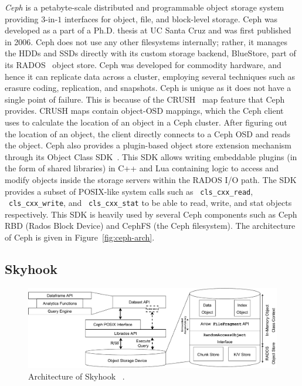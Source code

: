 \documentclass[11pt]{article}
\newcommand{\code}[1]{\colorbox{light-gray}{\texttt{#1}}}
\begin{document}
\textit{Ceph} is a petabyte-scale distributed and programmable object storage system providing $3$-in-$1$ interfaces for object, file, and block-level storage. Ceph was developed as a part of a Ph.D. thesis at UC Santa Cruz and was first published in 2006. Ceph does not use any other filesystems internally; rather, it manages the HDDs and SSDs directly with its custom storage backend, BlueStore, part of its RADOS~\cite{weil2007rados} object store. Ceph was developed for commodity hardware, and hence it can replicate data across a cluster, employing several techniques such as erasure coding, replication, and snapshots. Ceph is unique as it does not have a single point of failure. This is because of the CRUSH~\cite{weil2006crush} map feature that Ceph provides. CRUSH maps contain object-OSD mappings, which the Ceph client uses to calculate the location of an object in a Ceph cluster. After figuring out the location of an object, the client directly connects to a Ceph OSD and reads the object. Ceph also provides a plugin-based object store extension mechanism through its Object Class SDK~\cite{objectclasssdk}. This SDK allows writing embeddable plugins (in the form of shared libraries) in C++ and Lua containing logic to access and modify objects inside the storage servers within the RADOS I/O path. The SDK provides a subset of POSIX-like system calls such as ~\code{cls\_cxx\_read}, ~\code{cls\_cxx\_write}, and ~\code{cls\_cxx\_stat} to be able to read, write, and stat objects respectively. This SDK is heavily used by several Ceph components such as Ceph RBD (Rados Block Device) and CephFS (the Ceph filesystem). The architecture of Ceph is given in Figure~\ref{fig:ceph-arch}.

\subsection{Skyhook}
\begin{figure}[h]
\centering
\includegraphics[width=\textwidth]{figs/implarch.pdf}
\caption{Architecture of Skyhook ~\cite{jc2022skyhook}.}
\label{fig:skyhook-arch}
\end{figure}
\end{document}
